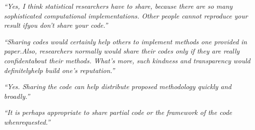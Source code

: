 \documentclass[12pt]{beamer}
\newcommand\ans[1]{{\it ``#1''}}
\begin{document}
\begin{frame}

  \ans{Yes, I think statistical researchers have to share, because there are so many sophisticated computational implementations.  Other people cannot reproduce your result ifyou don’t share your code.}


  \ans{Sharing codes would certainly help others to implement methods one provided in paper.Also,  researchers  normally  would  share  their  codes  only  if  they  are  really  confidentabout their methods.  What’s more, such kindness and transparency would definitelyhelp build one’s reputation.}


\ans{Yes.  Sharing the code can help distribute proposed methodology quickly and broadly.}

\ans{It  is  perhaps  appropriate  to  share  partial  code  or  the  framework  of  the  code  whenrequested.}

  







\end{frame}
\end{document}
